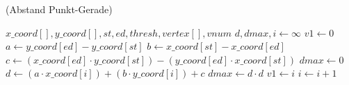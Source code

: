 \begin{algorithm}[!ht]
\caption{ (Abstand Punkt-Gerade)}
\label{alg:getvertex-1}
\begin{algorithmic}[1]
	\Require $\mathit{x\_coord}[], \mathit{y\_coord}[], \mathit{st}, \mathit{ed}, \mathit{thresh}, \mathit{vertex}[],
	 \mathit{vnum}$
	\State $d, \mathit{dmax}, i \gets \infty$
	\label{alg:getvertex-1-init-start}
	\State $\mathit{v1} \gets 0$
	\label{alg:getvertex-1-init-end}
	\State $a \gets \mathit{y\_coord}[ed] - \mathit{y\_coord}[st]$
	\label{alg:getvertex-1-line-start}
	\State $b \gets \mathit{x\_coord}[st] - \mathit{x\_coord}[ed]$
	\State $c \gets \left(\mathit{x\_coord}[ed] \cdot \mathit{y\_coord}[st]\right) - \left(\mathit{y\_coord}[ed] \cdot
	 \mathit{x\_coord}[st]\right)$
	\label{alg:getvertex-1-line-end}
	\State $\mathit{dmax} \gets 0$
	\label{alg:getvertex-1-loop-start}
		\State $d \gets \left(a \cdot \mathit{x\_coord}[i]\right) + \left(b \cdot \mathit{y\_coord}[i]\right) + c$
			\State $\mathit{dmax} \gets d \cdot d$
			\label{alg:getvertex-1-savedmax}
			\State $\mathit{v1} \gets i$
		\EndIf
		\State $i \gets i + 1$
	\EndFor
	\label{alg:getvertex-1-loop-end}
\end{algorithmic}
\end{algorithm}
